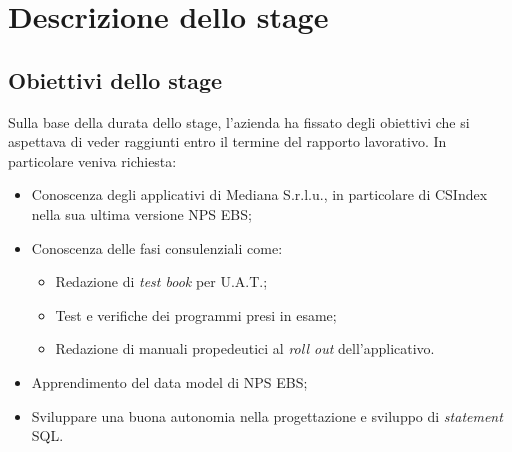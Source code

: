 
\chapter{Descrizione dello stage}
\label{cap:descrizione-stage}





\section{Obiettivi dello stage}
\label{obiettivi}
Sulla base della durata dello stage, l'azienda ha fissato degli obiettivi che si aspettava di veder raggiunti entro il termine del rapporto lavorativo. In particolare veniva richiesta:
\begin{itemize}
\item Conoscenza degli applicativi di Mediana S.r.l.u., in particolare di CSIndex nella sua ultima versione NPS EBS;
\item Conoscenza delle fasi consulenziali come:
	\begin{itemize}
	\item Redazione di \textit{test book} per U.A.T.\footnotemark[1];
	\item Test e verifiche dei programmi presi in esame;
	\item Redazione di manuali propedeutici al \textit{roll out} dell'applicativo.
	\end{itemize}
\item Apprendimento del \gls{data model} di NPS EBS;
\item Sviluppare una buona autonomia nella progettazione e sviluppo di \textit{statement} SQL.
\end{itemize}

